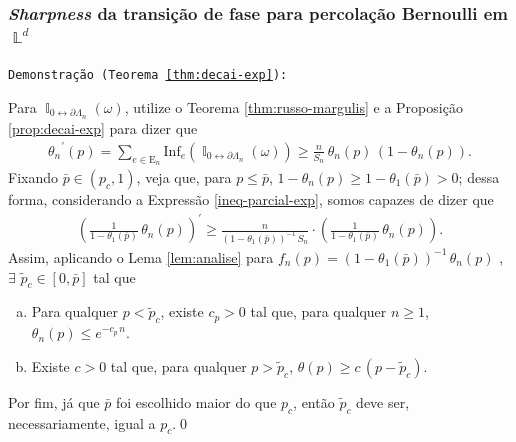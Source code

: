 \documentclass[9pt]{beamer}
\theoremstyle{definition} %
\DeclareMathOperator{\IX}{\mathbb{I}} %
\DeclareMathOperator{\LX}{\mathbb{L}} %
\begin{document}
	\begin{frame}[t]
	\frametitle{\textit{Sharpness} da transição de fase para percolação Bernoulli em $\LX^d$}
		\texttt{Demonstração (Teorema \ref{thm:decai-exp}):}
	
		Para $\IX_{0 \leftrightarrow \partial\Lambda_n}(\omega)$, utilize o Teorema \ref{thm:russo-margulis} e a Proposição \ref{prop:decai-exp} para dizer que
		\begin{align} \label{ineq-parcial-exp}
		{\theta_n}^{\prime}(p) = \sum_{e \in \text{E}_n}\text{Inf}_e(\IX_{0 \leftrightarrow \partial\Lambda_n}(\omega)) \geq \frac{n}{S_n} \, \theta_n(p) \, (1 - \theta_n(p)).
		\end{align}\pause
		 Fixando $\bar{p} \in (p_c, 1)$, veja que, para $p \leq \bar{p}$, $1 - \theta_n(p) \geq 1 - \theta_1(\bar{p}) > 0$; dessa forma, considerando a Expressão \ref{ineq-parcial-exp}, somos capazes de dizer que
		\begin{align*}
		\left(\frac{1}{1 - \theta_1(\bar{p})}\,\theta_n(p)\right)^{\prime} \geq \frac{n}{(1 - \theta_1(\bar{p}))^{-1}\, S_n} \cdot \left(\frac{1}{1 - \theta_1(\bar{p})}\,\theta_n(p)\right).
		\end{align*}\pause
		Assim, aplicando o Lema \ref{lem:analise} para $f_n(p) = (1 - \theta_1(\bar{p}))^{-1}\,\theta_n(p)$ , $\exists$ $\tilde{p}_c \in [0, \bar{p}]$ tal que	\begin{enumerate}[a.]
			\item Para qualquer $p < \tilde{p}_c$, existe $c_p > 0$ tal que, para qualquer $n \geq 1$, $\theta_n(p) \leq e^{-c_p\,n}$.
			\item Existe $c > 0$ tal que, para qualquer $p > \tilde{p}_c$, $\theta(p) \geq c\,(p - \tilde{p}_c)$.
		\end{enumerate}
		Por fim, já que $\bar{p}$ foi escolhido maior do que $p_c$, então $\tilde{p}_c$ deve ser, necessariamente, igual a $p_c$.\hspace{\fill}\qed
	\end{frame}
\end{document}
